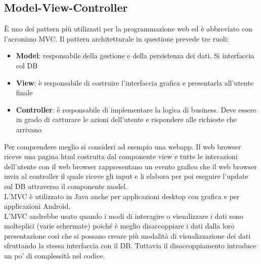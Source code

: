 \subsection{Model-View-Controller}
È uno dei pattern più utilizzati per la programmazione web ed è abbreviato con l'acronimo MVC.
Il pattern architetturale in questione prevede tre ruoli:
\begin{itemize}[noitemsep]
    \item \textbf{Model}: responsabile della gestione e della persistenza dei dati. Si interfaccia col \acrfull{DB}
    \item \textbf{View}: è responsabile di costruire l'interfaccia grafica e presentarla all'utente finale
    \item \textbf{Controller}: è responsabile di implementare la logica di business. Deve essere in grado di catturare le azioni dell'utente e rispondere alle richieste che arrivano
\end{itemize}
Per comprendere meglio si consideri ad esempio una webapp.
Il web browser riceve una pagina html costruita dal componente view e tutte le interazioni dell'utente con il web browser rappresentano un evento grafico che il web browser invia al controller il quale riceve gli input e li elabora per poi eseguire l'update sul \acrshort{DB} attraverso il componente model.\\
L'MVC è utilizzato in Java anche per applicazioni desktop con grafica e per applicazioni Android.\\
L'MVC andrebbe usato quando i modi di interagire o visualizzare i dati sono molteplici (varie schermate) poiché è meglio disaccoppiare i dati dalla loro presentazione così che si possano creare più modalità di visualizzazione dei dati sfruttando la stessa interfaccia con il \acrshort{DB}.
Tuttavia il disaccoppiamento introduce un po' di complessità nel codice.

